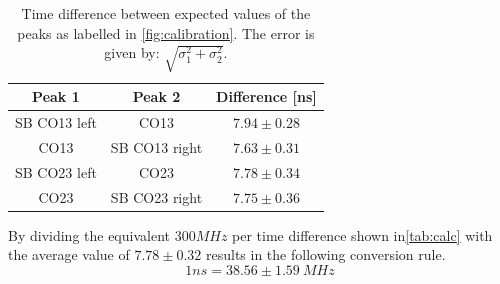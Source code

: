 \documentclass[]{article}
\begin{document}
\begin{table}[H]
\centering
\begin{tabular}{c|c|c}

Peak 1 & Peak 2 & Difference [ns] \\ \hline\hline
SB CO13 left & CO13 & $7.94 \pm 0.28$ \\
CO13 & SB CO13 right & $7.63 \pm 0.31$ \\ \hline 
SB CO23 left & CO23  & $7.78 \pm 0.34$ \\
CO23 & SB CO23 right & $7.75 \pm 0.36$

\end{tabular}
\caption{Time difference between expected values of the peaks as labelled in \autoref{fig:calibration}. The error is given by: $\sqrt{\sigma_1^2 + \sigma_2^2}$.}
\label{tab:calc}
\end{table}

By dividing the equivalent $300MHz$ per time difference shown in\autoref{tab:calc} with the average value of $7.78 \pm 0.32$ results in the following conversion rule.
\begin{equation}
1ns = 38.56 \pm 1.59 \ MHz
\label{eq:conversion rule}
\end{equation}


\newpage
\end{document}
